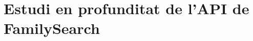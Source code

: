 \chapter{Estudi en profunditat de l'API de FamilySearch}

    
    
    
    
    
    
    
    
    
    
